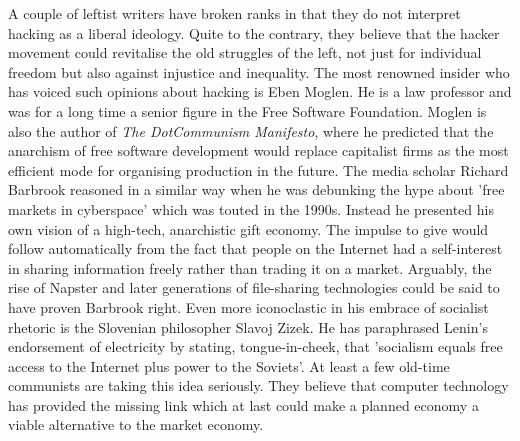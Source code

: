 A couple of leftist writers have broken ranks in that they do not interpret
hacking as a liberal ideology. Quite to the contrary, they believe that the
hacker movement could revitalise the old struggles of the left, not just for
individual freedom but also against injustice and inequality. The most renowned
insider who has voiced such opinions about hacking is Eben Moglen. He is a law
professor and was for a long time a senior f\hbox{}igure in the Free Software
Foundation. Moglen is also the author of \textit{The DotCommunism Manifesto},
where he predicted that the anarchism of free software development would replace
capitalist f\hbox{}irms as the most ef\hbox{}ficient mode for organising
production in the future\cite{gnunited-moglen99}. The media scholar Richard
Barbrook reasoned in a similar way when he was debunking the hype about 'free
markets in cyberspace' which was touted in the 1990s. Instead he presented his
own vision of a high-tech, anarchistic gift economy. The impulse to give would
follow automatically from the fact that people on the Internet had a
self-interest in sharing information freely rather than trading it on a
market\cite{gnunited-barbrook02}. Arguably, the rise of Napster and later
generations of f\hbox{}ile-sharing technologies could be said to have proven
Barbrook right. Even more iconoclastic in his embrace of socialist rhetoric is
the Slovenian philosopher Slavoj Zizek. He has paraphrased Lenin's endorsement
of electricity by stating, tongue-in-cheek, that 'socialism equals free access
to the Internet plus power to the Soviets'\cite{gnunited-zizek02}. At least a
few old-time communists are taking this idea seriously. They believe that
computer technology has provided the missing link which at last could make a
planned economy a viable alternative to the market
economy\cite{gnunited-pollack98}.

